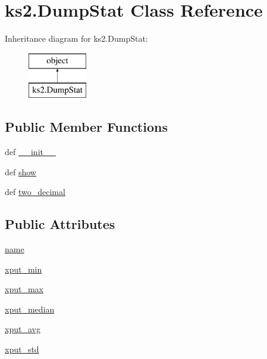 \hypertarget{classks2_1_1_dump_stat}{\section{ks2.\-Dump\-Stat Class Reference}
\label{classks2_1_1_dump_stat}
}
Inheritance diagram for ks2.\-Dump\-Stat\-:\begin{figure}[H]
\begin{center}
\leavevmode
\includegraphics[height=2.000000cm]{classks2_1_1_dump_stat}
\end{center}
\end{figure}
\subsection*{Public Member Functions}
\begin{DoxyCompactItemize}
\item 
def \hyperlink{classks2_1_1_dump_stat_a58340f5ca4da0de9a01c75b2f08bdb77}{\-\_\-\-\_\-init\-\_\-\-\_\-}
\item 
def \hyperlink{classks2_1_1_dump_stat_a570d6a1b8cee2bf794873ec8ee5c67ee}{show}
\item 
def \hyperlink{classks2_1_1_dump_stat_a1f7baffa638c21cdc7bc70bf962df14d}{two\-\_\-decimal}
\end{DoxyCompactItemize}
\subsection*{Public Attributes}
\begin{DoxyCompactItemize}
\item 
\hyperlink{classks2_1_1_dump_stat_a50be5dd8149aa0879c5af8f5f46d4913}{name}
\item 
\hyperlink{classks2_1_1_dump_stat_a0ea5e91ac694afcec22e218b3b2a87d9}{xput\-\_\-min}
\item 
\hyperlink{classks2_1_1_dump_stat_aa3a7543ea60422bff1f17070f33bd10d}{xput\-\_\-max}
\item 
\hyperlink{classks2_1_1_dump_stat_a165f17a52acf19d676de78ddd079e8cf}{xput\-\_\-median}
\item 
\hyperlink{classks2_1_1_dump_stat_aff6636ea1a88d90db552b0713b3111ee}{xput\-\_\-avg}
\item 
\hyperlink{classks2_1_1_dump_stat_aa454df892cfe10f8a6eafb9913b52c10}{xput\-\_\-std}
\end{DoxyCompactItemize}


